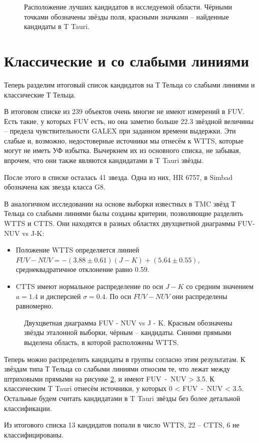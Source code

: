 \begin{figure}[ht]
\hfill
\caption{Расположение лучших кандидатов в исследуемой области. Чёрными точками обозначены звёзды поля, красными значками -- найденные кандидаты в T Tauri.}
\label{fig:pos}
\end{figure}


\section{Классические и со слабыми линиями}
Теперь разделим итоговый список кандидатов на Т Тельца со слабыми линиями и классические Т Тельца. 

В итоговом списке из 239 объектов очень многие не имеют измерений в FUV. Есть такие, у которых FUV есть, но она заметно больше 22.3 звёздной величины -- предела чувствительности GALEX при заданном времени выдержки. Эти слабые и, возможно, недостоверные источники мы отнесём к WTTS, которые могут не иметь УФ избытка. Вычеркнем их из основного списка, не забывая, впрочем, что они также являются кандидатами в T Tauri звёзды. 

После этого в списке осталась 41 звезда. Одна из них, HR 6757, в Simbad обозначена как звезда класса G8.

В аналогичном исследовании \cite{AIGdC2014galex} на основе выборки известных в TMC звёзд Т Тельца со слабыми линиями былы созданы критерии, позволяющие разделить WTTS и CTTS. Они 
находятся в разных областях двухцветной диаграммы FUV-NUV vs J-K:
\begin{itemize}
	\item Положение WTTS определяется линией $FUV - NUV = -(3.88 \pm 0.61)(J - K) + (5.64 \pm 0.55)$, среднеквадратичное отклонение равно 0.59.
	\item CTTS имеют нормальное распределение по оси $J - K$ со средним значением $a = 1.4$ и дисперсией $\sigma = 0.4$. По оси $FUV - NUV$ они распределены равномерно.
\end{itemize}

\begin{figure}[ht]
\hfill
\caption{Двухцветная диаграмма FUV - NUV vs J - K. Красным обозначены звёзды эталонной выборки, чёрным -- кандидаты. Синими прямыми выделена область, в которой расположены WTTS.}
\label{fig:trend}
\end{figure}

Теперь можно распределить кандидаты в группы согласно этим результатам. К звёздам типа Т Тельца со слабыми линиями относим те, что лежат между штриховыми прямыми на рисунке \ref{fig:trend}, и имеют FUV~-~NUV > 3.5. К классическим T Tauri отнесём источники, у которых 0 < FUV~-~NUV < 3.5. Остальные будем считать кандидатами в T Tauri звёзды без более детальной классификации.

Из итогового списка 13 кандидатов попали в число WTTS, 22 -- CTTS, 6 не классифицированы.



